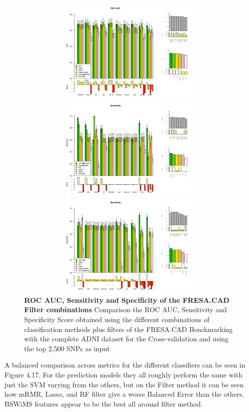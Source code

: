    
\begin{figure}[!ht]
\centerline{\includegraphics[width=5in,height=2in]{images/results/fresaConc.png}}
\centerline{\includegraphics[width=5in,height=2in]{images/results/fresaSens.png}}
\centerline{\includegraphics[width=5in,height=2in]{images/results/fresaSpec.png}}
\caption{{\bf ROC AUC, Sensitivity and Specificity of the FRESA.CAD Filter combinations} 
Comparison the ROC AUC, Sensitivity and Specificity Score obtained using the different combinations of classification methods plus filters of the FRESA.CAD Benchmarking with the complete ADNI dataset for the Cross-validation and using the top 2,500 SNPs as input}
\label{fig18}
\end{figure}
\newpage
A balanced comparison across metrics for the different classifiers can be seen in Figure 4.17. For the prediction models they all roughly perform the same with just the SVM varying from the others, but on the Filter method it can be seen how mRMR, Lasso, and RF filter give a worse Balanced Error than the others. BSWiMS features appear to be the best all around filter method.

